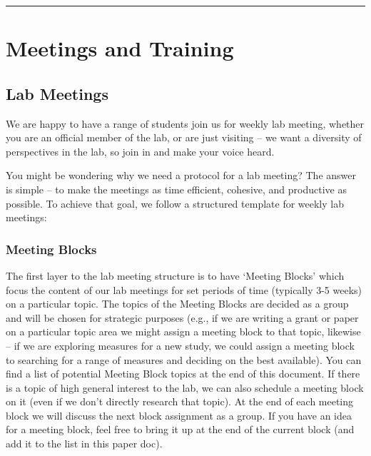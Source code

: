\documentclass[]{book}
\begin{document}
\begin{center}\rule{0.5\linewidth}{\linethickness}\end{center}

\hypertarget{meetings-and-training}{%
\section{Meetings and Training}\label{meetings-and-training}}

\hypertarget{lab-meetings}{%
\subsection{Lab Meetings}\label{lab-meetings}}

We are happy to have a range of students join us for weekly lab meeting, whether you are an official member of the lab, or are just visiting -- we want a diversity of perspectives in the lab, so join in and make your voice heard.

You might be wondering why we need a protocol for a lab meeting? The answer is simple -- to make the meetings as time efficient, cohesive, and productive as possible. To achieve that goal, we follow a structured template for weekly lab meetings:

\hypertarget{meeting-blocks}{%
\subsubsection{Meeting Blocks}\label{meeting-blocks}}

The first layer to the lab meeting structure is to have `Meeting Blocks' which focus the content of our lab meetings for set periods of time (typically 3-5 weeks) on a particular topic. The topics of the Meeting Blocks are decided as a group and will be chosen for strategic purposes (e.g., if we are writing a grant or paper on a particular topic area we might assign a meeting block to that topic, likewise -- if we are exploring measures for a new study, we could assign a meeting block to searching for a range of measures and deciding on the best available). You can find a list of potential Meeting Block topics at the end of this document. If there is a topic of high general interest to the lab, we can also schedule a meeting block on it (even if we don't directly research that topic). At the end of each meeting block we will discuss the next block assignment as a group. If you have an idea for a meeting block, feel free to bring it up at the end of the current block (and add it to the list in this paper doc).
\end{document}
